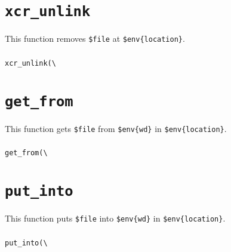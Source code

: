 \documentclass[a4paper,10pt]{report}
\def\|{\verb|} %|
\begin{document}
\section{\texttt{xcr\_unlink}}

This function removes \texttt{\$file} at \texttt{\$env\{location\}}.

\subsubsection{\format}

\begin{boxnote}
\begin{alltt}
xcr_unlink(\|\|%\textit{env}, $file);
\end{alltt}
\end{boxnote}
\vspace{\baselineskip}

\section{\texttt{get\_from}}

This function gets \texttt{\$file} from \texttt{\$env\{wd\}} in
\texttt{\$env\{location\}}.

\subsubsection{\format}

\begin{boxnote}
\begin{alltt}
get_from(\|\|%\textit{env}, $file);
\end{alltt}
\end{boxnote}
\vspace{\baselineskip}

\section{\texttt{put\_into}}

This function puts \texttt{\$file} into \texttt{\$env\{wd\}} in
\texttt{\$env\{location\}}.

\subsubsection{\format}

\begin{boxnote}
\begin{alltt}
put_into(\|\|%\textit{env}, $file);
\end{alltt}
\end{boxnote}
\vspace{\baselineskip}
\end{document}
